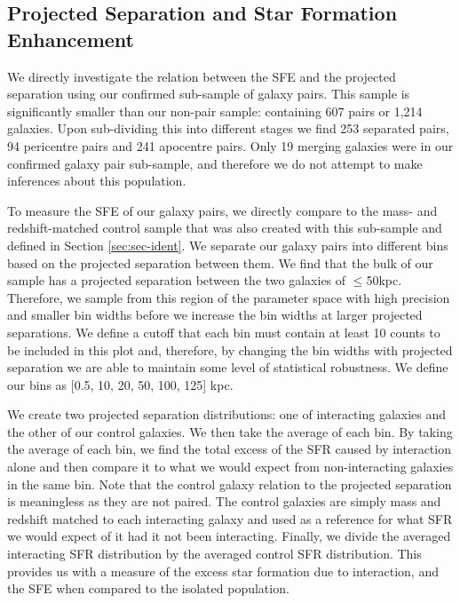 \subsection{Projected Separation and Star Formation Enhancement}
\noindent We directly investigate the relation between the SFE and the projected separation using our confirmed sub-sample of galaxy pairs. This sample is significantly smaller than our non-pair sample: containing 607 pairs or 1,214 galaxies. Upon sub-dividing this into different stages we find 253 separated pairs, 94 pericentre pairs and 241 apocentre pairs. Only 19 merging galaxies were in our confirmed galaxy pair sub-sample, and therefore we do not attempt to make inferences about this population. 

To measure the SFE of our galaxy pairs, we directly compare to the mass- and redshift-matched control sample that was also created with this sub-sample and defined in Section \ref{sec:sec-ident}. We separate our galaxy pairs into different bins based on the projected separation between them. We find that the bulk of our sample has a projected separation between the two galaxies of $\leq$50kpc. Therefore, we sample from this region of the parameter space with high precision and smaller bin widths before we increase the bin widths at larger projected separations. We define a cutoff that each bin must contain at least 10 counts to be included in this plot and, therefore, by changing the bin widths with projected separation we are able to maintain some level of statistical robustness. We define our bins as [0.5, 10, 20, 50, 100, 125] kpc.

We create two projected separation distributions: one of interacting galaxies and the other of our control galaxies. We then take the average of each bin. By taking the average of each bin, we find the total excess of the SFR caused by interaction alone and then compare it to what we would expect from non-interacting galaxies in the same bin. Note that the control galaxy relation to the projected separation is meaningless as they are not paired. The control galaxies are simply mass and redshift matched to each interacting galaxy and used as a reference for what SFR we would expect of it had it not been interacting. Finally, we divide the averaged interacting SFR distribution by the averaged control SFR distribution. This provides us with a measure of the excess star formation due to interaction, and the SFE when compared to the isolated population.

